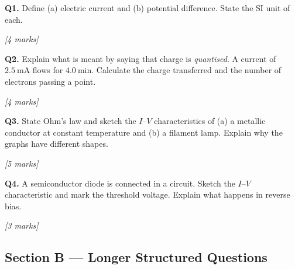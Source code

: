 \begin{tcolorbox}[colback=white, colframe=midblue, breakable]

\begin{minipage}{\linewidth}
\textbf{Q1.} Define (a) electric current and (b) potential difference. State the SI unit of each.
\par\hfill\textit{[4 marks]}
\vspace{3.5cm}
\end{minipage}

\begin{minipage}{\linewidth}
\textbf{Q2.} Explain what is meant by saying that charge is \textit{quantised}. A current of $2.5\ \text{mA}$ flows for $4.0\ \text{min}$. Calculate the charge transferred and the number of electrons passing a point.
\par\hfill\textit{[4 marks]}
\vspace{4cm}
\end{minipage}

\begin{minipage}{\linewidth}
\textbf{Q3.} State Ohm's law and sketch the $I$--$V$ characteristics of (a) a metallic conductor at constant temperature and (b) a filament lamp. Explain why the graphs have different shapes.
\par\hfill\textit{[5 marks]}
\vspace{5.5cm}
\end{minipage}

\begin{minipage}{\linewidth}
\textbf{Q4.} A semiconductor diode is connected in a circuit. Sketch the $I$--$V$ characteristic and mark the threshold voltage. Explain what happens in reverse bias.
\par\hfill\textit{[3 marks]}
\vspace{4cm}
\end{minipage}

\end{tcolorbox}

\subsection*{Section B — Longer Structured Questions}

